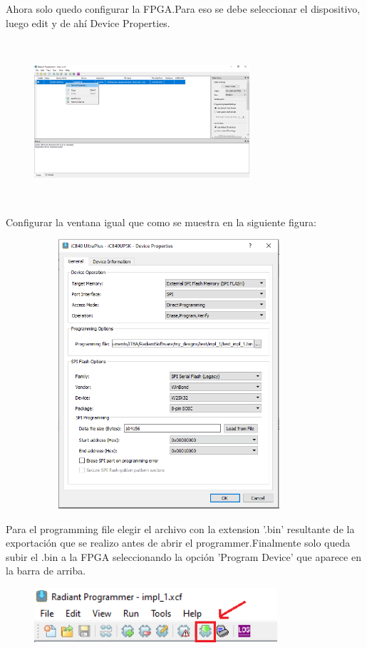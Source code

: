 \documentclass{article}
\begin{document}
Ahora solo quedo configurar la FPGA.Para eso se debe seleccionar el dispositivo, luego edit y de ahí Device Properties.
	\begin{figure}[H]
 	\centering
	\includegraphics[height=6cm, width=8cm]{Imagenes/EditProg.png}
	\end{figure}
Configurar la ventana igual que como se muestra en la siguiente figura:
	\begin{figure}[H]
 	\centering
	\includegraphics[height=10cm, width=10cm]{Imagenes/Config.png}
	\end{figure}
Para el programming file elegir el archivo con la extension '.bin' resultante de la exportación que se realizo antes de abrir el programmer.Finalmente solo queda subir el .bin a la FPGA seleccionando la opción 'Program Device' que aparece en la barra de arriba.
	\begin{figure}[H]
 	\centering
	\includegraphics[height=2cm, width=\textwidth]{Imagenes/runprog.png}
	\end{figure}
\end{document}
